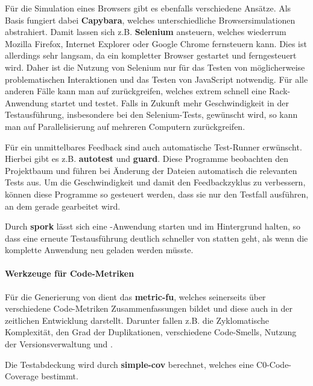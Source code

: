 Für die Simulation eines Browsers gibt es ebenfalls verschiedene Ansätze. Als Basis fungiert dabei \textbf{Capybara}, welches unterschiedliche Browsersimulationen abstrahiert. Damit lassen sich z.B. \textbf{Selenium} ansteuern, welches wiederrum Mozilla Firefox, Internet Explorer oder Google Chrome fernsteuern kann. Dies ist allerdings sehr langsam, da ein kompletter Browser gestartet und ferngesteuert wird. Daher ist die Nutzung von Selenium nur für das Testen von möglicherweise problematischen Interaktionen und das Testen von JavaScript notwendig. Für alle anderen Fälle kann man auf \textbf{} zurückgreifen, welches extrem schnell eine Rack-Anwendung startet und testet.
Falls in Zukunft mehr Geschwindigkeit in der Testausführung, insbesondere bei den Selenium-Tests, gewünscht wird, so kann man auf Parallelisierung auf mehreren Computern zurückgreifen.

Für ein unmittelbares Feedback sind auch automatische Test-Runner erwünscht. Hierbei gibt es z.B. \textbf{autotest} und \textbf{guard}. Diese Programme beobachten den Projektbaum und führen bei Änderung der Dateien automatisch die relevanten Tests aus. Um die Geschwindigkeit und damit den Feedbackzyklus zu verbessern, können diese Programme so gesteuert werden, dass sie nur den Testfall ausführen, an dem gerade gearbeitet wird.

Durch \textbf{spork} lässt sich eine -Anwendung starten und im Hintergrund halten, so dass eine erneute Testausführung deutlich schneller von statten geht, als wenn die komplette Anwendung neu geladen werden müsste.


\paragraph{Werkzeuge für Code-Metriken}  Für die Generierung von  dient das  \textbf{metric-fu}, welches seinerseits über verschiedene Code-Metriken Zusammenfassungen bildet und diese auch in der zeitlichen Entwicklung darstellt. Darunter fallen z.B. die Zyklomatische Komplexität, den Grad der Duplikationen, verschiedene Code-Smells, Nutzung der Versionsverwaltung und .

Die Testabdeckung wird durch \textbf{simple-cov} berechnet, welches eine C0-Code-Coverage bestimmt.

